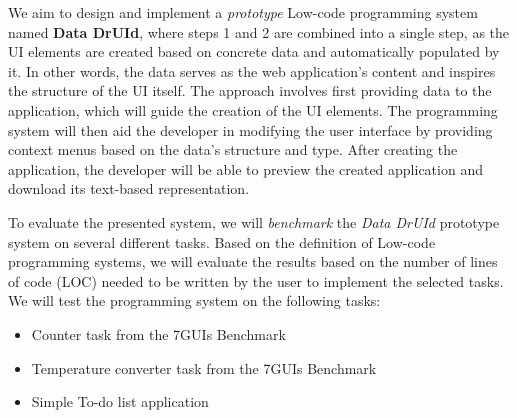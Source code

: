 We aim to design and implement a \emph{prototype} Low-code programming system named \textbf{Data DrUId}, where steps 1 and 2 are combined into a single step, as the UI elements are created based on concrete data and automatically populated by it.
In other words, the data serves as the web application's content and inspires the structure of the UI itself.
The approach involves first providing data to the application, which will guide the creation of the UI elements.
The programming system will then aid the developer in modifying the user interface by providing context menus based on the data's structure and type.
After creating the application, the developer will be able to preview the created application and download its text-based representation.

To evaluate the presented system, we will \emph{benchmark} the \emph{Data DrUId} prototype system on several different tasks.
Based on the definition of Low-code programming systems, we will evaluate the results based on the number of lines of code (LOC) needed to be written by the user to implement the selected tasks.
We will test the programming system on the following tasks:
\begin{itemize}
	\item Counter task from the 7GUIs Benchmark
	\item Temperature converter task from the 7GUIs Benchmark
	\item Simple To-do list application
\end{itemize}

